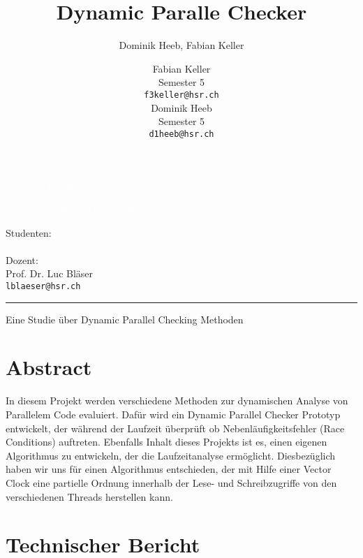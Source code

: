 \documentclass[10pt,a4paper]{article}
\author{Dominik Heeb, Fabian Keller}
\title{Dynamic Paralle Checker}
\author{%
    Fabian Keller \\
    Semester 5 \\
    \texttt{f3keller@hsr.ch}\vspace{15pt} \\
    Dominik Heeb \\
    Semester 5 \\
    \texttt{d1heeb@hsr.ch}
    }
\makeatletter
\def\printauthor{%
    {\LARGE Studenten:\\\vspace{10pt}
    \large \@author \\\vspace{20pt}
    \LARGE Dozent:\\\vspace{10pt}
    \large Prof. Dr. Luc Bläser \\
	\texttt{lblaeser@hsr.ch}}}
\makeatother
\begin{document}
\begin{titlepage}
\BgThispage
{}
\vspace*{2cm}
\noindent
\textcolor{white}{\bigsf Dynamic Parallel Checker\\[0.5cm] \begin{huge}Semesterarbeit - Technische Dokumentation\end{huge}}
\vspace*{2.0cm}\par
\noindent
\begin{minipage}{0.35\linewidth}
    \begin{flushright}
        \printauthor
    \end{flushright}
\end{minipage} \hspace{15pt}
%
\begin{minipage}{0.02\linewidth}
    \rule{1pt}{300pt}
\end{minipage} \hspace{40pt}
%
\begin{minipage}{0.6\linewidth}
\begin{center}
\begin{huge}
Eine Studie über Dynamic Parallel Checking Methoden
\end{huge}
\end{center}
\end{minipage}
\end{titlepage}
\restoregeometry

\newpage
\tableofcontents 
\newpage

\section{Abstract}
\begin{flushleft}
In diesem Projekt werden verschiedene Methoden zur dynamischen Analyse von Parallelem Code evaluiert. Dafür wird ein Dynamic Parallel Checker Prototyp entwickelt, der während der Laufzeit überprüft ob Nebenläufigkeitsfehler (Race Conditions) auftreten. Ebenfalls Inhalt dieses Projekts ist es, einen eigenen Algorithmus zu entwickeln, der die Laufzeitanalyse ermöglicht. Diesbezüglich haben wir uns für einen Algorithmus entschieden, der mit Hilfe einer Vector Clock eine partielle Ordnung innerhalb der Lese- und Schreibzugriffe von den verschiedenen Threads herstellen kann.\\

\end{flushleft}
\section{Technischer Bericht}
\end{document}
